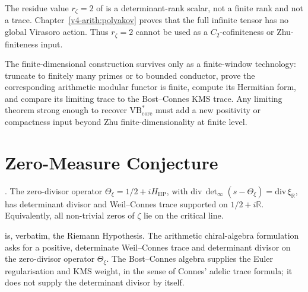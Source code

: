 \begin{remark}
\label{v4-arith:vb:rem:c-not-zhu-finite}
The residue value \(r_{\zeta}=2\) of
 is a determinant-rank scalar, not a
finite rank and not a trace. Chapter~\ref{v4-arith:polyakov} proves
that the full infinite tensor has no global Virasoro action. Thus
\(r_{\zeta}=2\) cannot be used as a \(C_{2}\)-cofiniteness or
Zhu-finiteness input.
\end{remark}

\begin{remark}
\label{v4-arith:vb:rem:zhu-surviving-direction}
The finite-dimensional construction survives only as a finite-window
technology: truncate to finitely many primes or to bounded conductor,
prove the corresponding arithmetic modular functor is finite, compute
its Hermitian form, and compare its limiting trace to the
Bost--Connes KMS trace. Any limiting theorem strong enough to recover
\(\mathrm{VB}^{*}_{\mathrm{core}}\) must add a new positivity or compactness
input beyond Zhu finite-dimensionality at finite level.
\end{remark}

\section{Zero-Measure Conjecture}
\label{v4-arith:vb:open-problem}

\begin{conjecture}
\label{v4-arith:vb:conj:VB-core}
\ClaimStatusConjectured. The zero-divisor operator
\(\Theta_{\xi}=1/2+iH_{\mathrm{HP}}\), with
\(\mathrm{div}\,\det_{\infty}(s-\Theta_{\xi})=\mathrm{div}\,\xi_{\mathbb R}\),
has determinant divisor and Weil--Connes trace supported on
\(1/2+i\mathbb R\).
Equivalently, all
non-trivial zeros of \(\zeta\) lie on the critical line.
\end{conjecture}

\begin{remark}
\label{v4-arith:vb:rem:conjecture-is-RH}
 is, verbatim, the Riemann Hypothesis.
The arithmetic chiral-algebra formulation asks for a positive,
determinate Weil--Connes trace and determinant divisor on the zero-divisor operator
\(\Theta_{\xi}\). The Bost--Connes algebra supplies the Euler
regularisation and KMS weight, in the sense of Connes' adelic trace
formula; it does not supply the determinant divisor by itself.
\end{remark}

